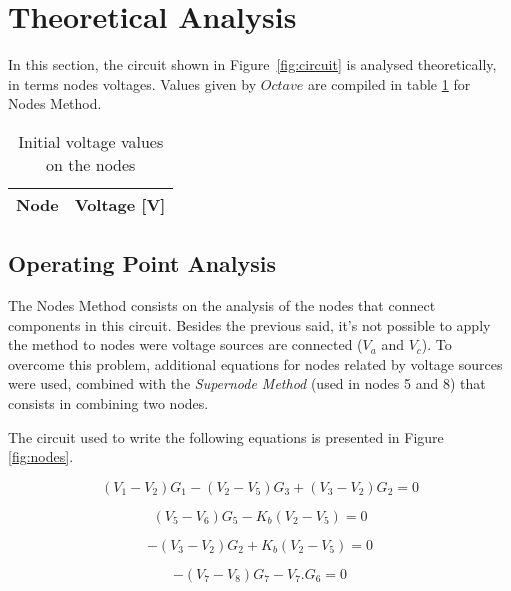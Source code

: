 \section{Theoretical Analysis}
\label{sec:analysis}

In this section, the circuit shown in Figure~\ref{fig:circuit} is analysed
theoretically, in terms nodes voltages. Values given by $Octave$ are compiled in table \ref{tab:oct1_tab} for Nodes Method.

\begin{table}[h]
  \centering
  \begin{tabular}{|l|r|}
    \hline    
    {\bf Node} & {\bf Voltage [V]} \\ \hline
    
  \end{tabular}
  \caption{Initial voltage values on the nodes}
  \label{tab:oct1_tab}
\end{table}



\subsection{Operating Point Analysis}

The Nodes Method consists on the analysis of the nodes that connect components in this circuit. Besides the previous said, it's not possible to apply the method to nodes were voltage sources are connected ($V_a$ and $V_c$). To overcome this problem, additional equations for nodes related by voltage sources were used, combined with the \textit{Supernode Method} (used in nodes 5 and 8) that consists in combining two nodes. 

The circuit used to write the following equations is presented in Figure \ref{fig:nodes}.



\begin{equation}
  (V_1 - V_2) G_1 - (V_2 - V_5) G_3 + (V_3 - V_2) G_2 = 0
  \label{eq_1}
\end{equation}

\begin{equation}
  (V_5 - V_6) G_5 - K_b (V_2 - V_5) = 0
  \label{eq_2}
\end{equation}

\begin{equation}
  - (V_3 - V_2) G_2 + K_b (V_2 - V_5) = 0
  \label{eq_3}
\end{equation}

\begin{equation}
  - (V_7 - V_8) G_7 - V_7 . G_6 = 0
  \label{eq_4}
\end{equation}

